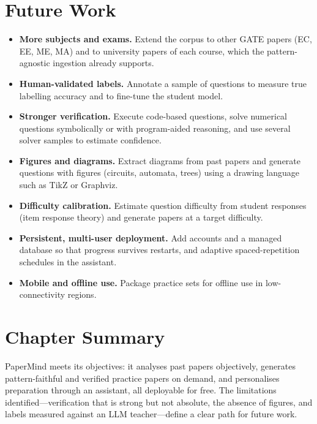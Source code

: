 \section{Future Work}
\begin{itemize}
  \item \textbf{More subjects and exams.} Extend the corpus to other GATE papers (EC, EE, ME, MA) and to university
        papers of each course, which the pattern-agnostic ingestion already supports.
  \item \textbf{Human-validated labels.} Annotate a sample of questions to measure true labelling accuracy and to
        fine-tune the student model.
  \item \textbf{Stronger verification.} Execute code-based questions, solve numerical questions symbolically or with
        program-aided reasoning, and use several solver samples to estimate confidence.
  \item \textbf{Figures and diagrams.} Extract diagrams from past papers and generate questions with figures (circuits,
        automata, trees) using a drawing language such as TikZ or Graphviz.
  \item \textbf{Difficulty calibration.} Estimate question difficulty from student responses (item response theory)
        and generate papers at a target difficulty.
  \item \textbf{Persistent, multi-user deployment.} Add accounts and a managed database so that progress survives
        restarts, and adaptive spaced-repetition schedules in the assistant.
  \item \textbf{Mobile and offline use.} Package practice sets for offline use in low-connectivity regions.
\end{itemize}

\section{Chapter Summary}
PaperMind meets its objectives: it analyses past papers objectively, generates pattern-faithful and verified practice
papers on demand, and personalises preparation through an assistant, all deployable for free. The limitations
identified---verification that is strong but not absolute, the absence of figures, and labels measured against an LLM
teacher---define a clear path for future work.
